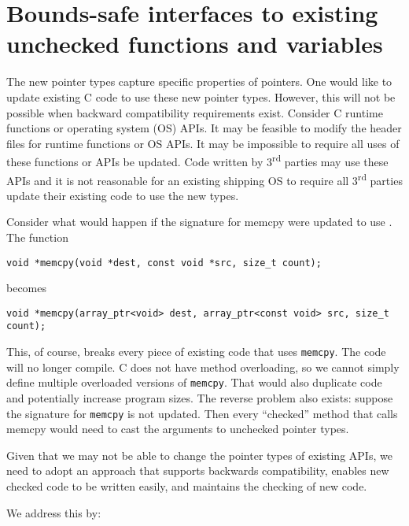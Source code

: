 \section{Bounds-safe interfaces to existing unchecked functions and variables}
\label{section:function-bounds-safe-interfaces}

The new pointer types capture specific properties of pointers. One would
like to update existing C code to use these new pointer types. However,
this will not be possible when backward compatibility requirements
exist. Consider C runtime functions or operating system (OS) APIs. 
It may be feasible to modify the header files for runtime functions or OS APIs. 
It may be
impossible to require all uses of these functions or APIs be updated.
Code written by 3\textsuperscript{rd} parties may use these APIs and it
is not reasonable for an existing shipping OS to require all
3\textsuperscript{rd} parties update their existing code to use the new
types.

Consider what would happen if the signature for memcpy were updated to
use \arrayptr. The function

\begin{verbatim}
void *memcpy(void *dest, const void *src, size_t count);
\end{verbatim}

becomes

\begin{verbatim}
void *memcpy(array_ptr<void> dest, array_ptr<const void> src, size_t count);
\end{verbatim}

This, of course, breaks every piece of existing code that uses \texttt{memcpy}.
The code will no longer compile. C does not have method overloading, so
we cannot simply define multiple overloaded versions of \texttt{memcpy}. That
would also duplicate code and potentially increase program sizes.
The reverse problem also exists: suppose the signature for \texttt{memcpy} is not
updated. Then every ``checked'' method that calls memcpy would need to cast
the arguments to unchecked pointer types.

Given that we may not be able to change the pointer types of existing
APIs, we need to adopt an approach that supports backwards
compatibility, enables new checked code to be written easily, and maintains
the checking of new code.

We address this by:


